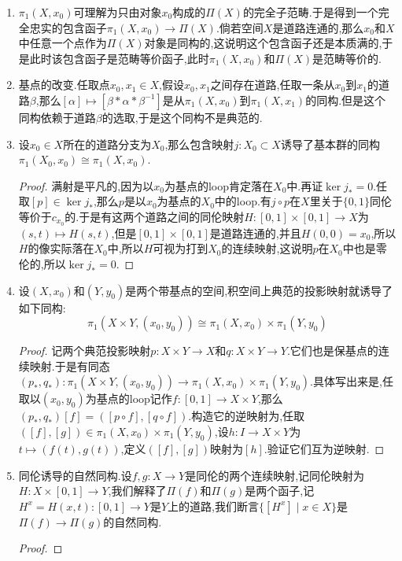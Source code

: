 \begin{enumerate}
	\item $\pi_1(X,x_0)$可理解为只由对象$x_0$构成的$\Pi(X)$的完全子范畴.于是得到一个完全忠实的包含函子$\pi_1(X,x_0)\to\Pi(X)$.倘若空间$X$是道路连通的,那么$x_0$和$X$中任意一个点作为$\Pi(X)$对象是同构的,这说明这个包含函子还是本质满的,于是此时该包含函子是范畴等价函子,此时$\pi_1(X,x_0)$和$\Pi(X)$是范畴等价的.
	\item 基点的改变.任取点$x_0,x_1\in X$,假设$x_0,x_1$之间存在道路,任取一条从$x_0$到$x_1$的道路$\beta$,那么$[\alpha]\mapsto[\beta\ast\alpha\ast\beta^{-1}]$是从$\pi_1(X,x_0)$到$\pi_1(X,x_1)$的同构.但是这个同构依赖于道路$\beta$的选取,于是这个同构不是典范的.
	\item 设$x_0\in X$所在的道路分支为$X_0$,那么包含映射$j:X_0\subset X$诱导了基本群的同构$\pi_1(X_0,x_0)\cong\pi_1(X,x_0)$.
	\begin{proof}
		
		满射是平凡的,因为以$x_0$为基点的loop肯定落在$X_0$中.再证$\ker j_*=0$.任取$[p]\in\ker j_*$,那么$p$是以$x_0$为基点的$X_0$中的loop.有$j\circ p$在$X$里关于$\{0,1\}$同伦等价于$c_{x_0}$的.于是有这两个道路之间的同伦映射$H:[0,1]\times[0,1]\to X$为$(s,t)\mapsto H(s,t)$,但是$[0,1]\times[0,1]$是道路连通的,并且$H(0,0)=x_0$,所以$H$的像实际落在$X_0$中,所以$H$可视为打到$X_0$的连续映射,这说明$p$在$X_0$中也是零伦的,所以$\ker j_*=0$.
	\end{proof}
    \item 设$(X,x_0)$和$(Y,y_0)$是两个带基点的空间,积空间上典范的投影映射就诱导了如下同构:
    $$\pi_1(X\times Y,(x_0,y_0))\cong\pi_1(X,x_0)\times\pi_1(Y,y_0)$$
    \begin{proof}
    	
    	记两个典范投影映射$p:X\times Y\to X$和$q:X\times Y\to Y$.它们也是保基点的连续映射.于是有同态$(p_*,q_*):\pi_1(X\times Y,(x_0,y_0))\to\pi_1(X,x_0)\times\pi_1(Y,y_0)$.具体写出来是,任取以$(x_0,y_0)$为基点的loop记作$f:[0,1]\to X\times Y$,那么$(p_*,q_*)[f]=([p\circ f],[q\circ f])$.构造它的逆映射为,任取$([f],[g])\in\pi_1(X,x_0)\times\pi_1(Y,y_0)$,设$h:I\to X\times Y$为$t\mapsto(f(t),g(t))$,定义$([f],[g])$映射为$[h]$.验证它们互为逆映射.
    \end{proof}
	\item 同伦诱导的自然同构.设$f,g:X\to Y$是同伦的两个连续映射,记同伦映射为$H:X\times[0,1]\to Y$,我们解释了$\Pi(f)$和$\Pi(g)$是两个函子,记$H^x=H(x,t):[0,1]\to Y$是$Y$上的道路,我们断言$\{[H^x]\mid x\in X\}$是$\Pi(f)\to\Pi(g)$的自然同构.
	\begin{proof}
		

\end{proof}
\end{enumerate}
